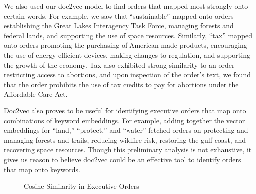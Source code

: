 \documentclass{article}
\begin{document}
{{We also used our doc2vec model to find orders that mapped most strongly onto certain words. For example, we saw that “sustainable” mapped onto orders establishing the Great Lakes Interagency Task Force, managing forests and federal lands, and supporting the use of space resources. Similarly, “tax” mapped onto orders promoting the purchasing of American-made products, encouraging the use of energy efficient devices, making changes to regulation, and supporting the growth of the economy.  Tax also exhibited strong similarity to an order restricting access to abortions, and upon inspection of the order’s text, we found that the order prohibits the use of tax credits to pay for abortions under the Affordable Care Act. 

Doc2vec also proves to be useful for identifying executive orders that map onto combinations of keyword embeddings. For example, adding together the vector embeddings for “land,” “protect,” and “water” fetched orders on protecting and managing forests and trails, reducing wildfire risk, restoring the gulf coast, and recovering space resources. Though this preliminary analysis is not exhaustive, it gives us reason to believe doc2vec could be an effective tool to identify orders that map onto keywords. 
}
\begin{figure}[H]
	\caption{\label{fig:my-label9} Cosine Similarity in Executive Orders}
\end{figure}
}
\end{document}
